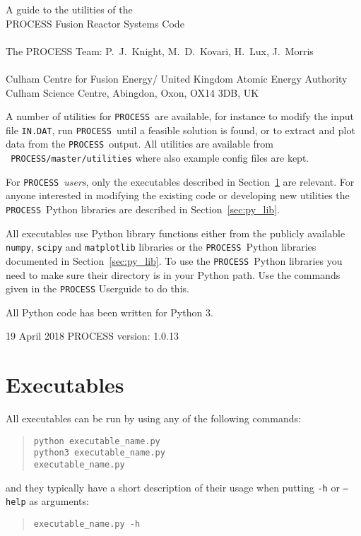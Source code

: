 \documentclass[11pt,a4paper]{article}
\newcommand{\indat}{\mbox{\texttt{IN.DAT}}}
\newcommand{\process}{\mbox{\texttt{PROCESS}}}
\newcommand{\version}{
19 April 2018
\hfill
PROCESS version: 1.0.13
}
\begin{document}
\footnotesize
\hfill

\vspace*{4cm}
\begin{center}
\Huge A guide to the utilities of the \\ PROCESS Fusion Reactor Systems Code\\
~\\ \LARGE The PROCESS Team: P.\ J.\ Knight, M.\ D.\ Kovari, H.\ Lux, J.\ Morris\\
~\\ \Large Culham Centre for Fusion Energy/ United Kingdom Atomic Energy Authority\\
Culham Science Centre, Abingdon, Oxon, OX14 3DB, UK
\end{center}

\normalsize
A number of utilities for \process\ are available, for instance to modify the
input file \indat, run \process\ until a feasible solution is found, or to
extract and plot data from the \process\ output. All utilities are available
from \texttt{~PROCESS/master/utilities} where also example config files are kept.

For \process\ \textit{users}, only the executables described in
Section~\ref{sec:py_exec} are relevant. For anyone interested in modifying the
existing code or developing new utilities the \process\ Python
libraries are described in Section~\ref{sec:py_lib}.

All executables use Python library functions either from the publicly
available \texttt{numpy}, \texttt{scipy} and \texttt{matplotlib} libraries or
the \process\ Python libraries documented in Section~\ref{sec:py_lib}. To use
the \process\ Python libraries you need to make sure their directory is in
your Python path. Use the commands given in the \process\/ Userguide to
do this.

All Python code has been written for Python 3.

\vfill
\footnotesize
\version
\normalsize

\tableofcontents

\newpage


\section{Executables}
\label{sec:py_exec}

All executables can be run by using any of the following commands:
\begin{quote}
\begin{verbatim}
python executable_name.py
python3 executable_name.py
executable_name.py
\end{verbatim}
\end{quote}
and they typically have a short description of their usage when putting
\texttt{-h} or \texttt{--help} as arguments:
\begin{quote}
\begin{verbatim}
executable_name.py -h
\end{verbatim}
\end{quote}
\end{document}
